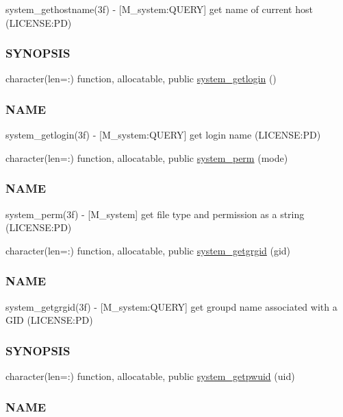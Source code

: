 \begin{DoxyCompactItemize}
\begin{DoxyCompactList}
system\+\_\+gethostname(3f) -\/ \mbox{[}M\+\_\+system\+:Q\+U\+E\+RY\mbox{]} get name of current host (L\+I\+C\+E\+N\+SE\+:PD) \subsubsection*{S\+Y\+N\+O\+P\+S\+IS}\end{DoxyCompactList}\item 
character(len=\+:) function, allocatable, public \mbox{\hyperlink{namespacem__system_a70f78645a1f130734005e190d469529d}{system\+\_\+getlogin}} ()
\begin{DoxyCompactList}\small\item\em \subsubsection*{N\+A\+ME}

system\+\_\+getlogin(3f) -\/ \mbox{[}M\+\_\+system\+:Q\+U\+E\+RY\mbox{]} get login name (L\+I\+C\+E\+N\+SE\+:PD) \end{DoxyCompactList}\item 
character(len=\+:) function, allocatable, public \mbox{\hyperlink{namespacem__system_ae8f39e1d4e420396319105e4e81f92b5}{system\+\_\+perm}} (mode)
\begin{DoxyCompactList}\small\item\em \subsubsection*{N\+A\+ME}

system\+\_\+perm(3f) -\/ \mbox{[}M\+\_\+system\mbox{]} get file type and permission as a string (L\+I\+C\+E\+N\+SE\+:PD) \end{DoxyCompactList}\item 
character(len=\+:) function, allocatable, public \mbox{\hyperlink{namespacem__system_aec137429fbb8c848db4ecd914466d7e8}{system\+\_\+getgrgid}} (gid)
\begin{DoxyCompactList}\small\item\em \subsubsection*{N\+A\+ME}

system\+\_\+getgrgid(3f) -\/ \mbox{[}M\+\_\+system\+:Q\+U\+E\+RY\mbox{]} get groupd name associated with a G\+ID (L\+I\+C\+E\+N\+SE\+:PD) \subsubsection*{S\+Y\+N\+O\+P\+S\+IS}\end{DoxyCompactList}\item 
character(len=\+:) function, allocatable, public \mbox{\hyperlink{namespacem__system_a59cd13de95dc9a65b444f02614ea39ce}{system\+\_\+getpwuid}} (uid)
\begin{DoxyCompactList}\small\item\em \subsubsection*{N\+A\+ME}


\end{DoxyCompactList}
\end{DoxyCompactItemize}

